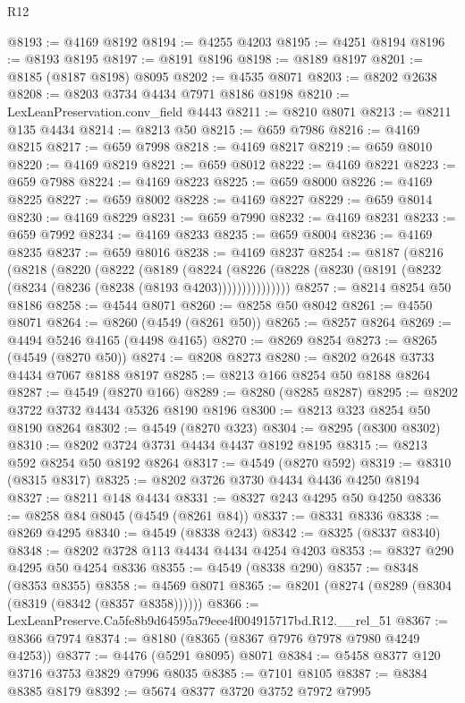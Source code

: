 \begin{lexlean}{R12}
\begin{coremodule}
@8193 := @4169 @8192
@8194 := @4255 @4203
@8195 := @4251 @8194
@8196 := @8193 @8195
@8197 := @8191 @8196
@8198 := @8189 @8197
@8201 := @8185 (@8187 @8198) @8095
@8202 := @4535 @8071
@8203 := @8202 @2638
@8208 := @8203 @3734 @4434 @7971 @8186 @8198
@8210 := LexLeanPreservation.conv_field @4443
@8211 := @8210 @8071
@8213 := @8211 @135 @4434
@8214 := @8213 @50
@8215 := @659 @7986
@8216 := @4169 @8215
@8217 := @659 @7998
@8218 := @4169 @8217
@8219 := @659 @8010
@8220 := @4169 @8219
@8221 := @659 @8012
@8222 := @4169 @8221
@8223 := @659 @7988
@8224 := @4169 @8223
@8225 := @659 @8000
@8226 := @4169 @8225
@8227 := @659 @8002
@8228 := @4169 @8227
@8229 := @659 @8014
@8230 := @4169 @8229
@8231 := @659 @7990
@8232 := @4169 @8231
@8233 := @659 @7992
@8234 := @4169 @8233
@8235 := @659 @8004
@8236 := @4169 @8235
@8237 := @659 @8016
@8238 := @4169 @8237
@8254 := @8187
    (@8216
      (@8218
        (@8220
          (@8222
            (@8189
              (@8224
                (@8226 (@8228 (@8230 (@8191 (@8232 (@8234 (@8236 (@8238 (@8193 @4203)))))))))))))))
@8257 := @8214 @8254 @50 @8186
@8258 := @4544 @8071
@8260 := @8258 @50 @8042
@8261 := @4550 @8071
@8264 := @8260 (@4549 (@8261 @50))
@8265 := @8257 @8264
@8269 := @4494 @5246 @4165 (@4498 @4165)
@8270 := @8269 @8254
@8273 := @8265 (@4549 (@8270 @50))
@8274 := @8208 @8273
@8280 := @8202 @2648 @3733 @4434 @7067 @8188 @8197
@8285 := @8213 @166 @8254 @50 @8188 @8264
@8287 := @4549 (@8270 @166)
@8289 := @8280 (@8285 @8287)
@8295 := @8202 @3722 @3732 @4434 @5326 @8190 @8196
@8300 := @8213 @323 @8254 @50 @8190 @8264
@8302 := @4549 (@8270 @323)
@8304 := @8295 (@8300 @8302)
@8310 := @8202 @3724 @3731 @4434 @4437 @8192 @8195
@8315 := @8213 @592 @8254 @50 @8192 @8264
@8317 := @4549 (@8270 @592)
@8319 := @8310 (@8315 @8317)
@8325 := @8202 @3726 @3730 @4434 @4436 @4250 @8194
@8327 := @8211 @148 @4434
@8331 := @8327 @243 @4295 @50 @4250
@8336 := @8258 @84 @8045 (@4549 (@8261 @84))
@8337 := @8331 @8336
@8338 := @8269 @4295
@8340 := @4549 (@8338 @243)
@8342 := @8325 (@8337 @8340)
@8348 := @8202 @3728 @113 @4434 @4434 @4254 @4203
@8353 := @8327 @290 @4295 @50 @4254 @8336
@8355 := @4549 (@8338 @290)
@8357 := @8348 (@8353 @8355)
@8358 := @4569 @8071
@8365 := @8201 (@8274 (@8289 (@8304 (@8319 (@8342 (@8357 @8358))))))
@8366 := LexLeanPreserve.Ca5fe8b9d64595a79eee4f004915717bd.R12.__rel_51
@8367 := @8366 @7974
@8374 := @8180 (@8365 (@8367 @7976 @7978 @7980 @4249 @4253))
@8377 := @4476 (@5291 @8095) @8071
@8384 := @5458 @8377 @120 @3716 @3753 @3829 @7996 @8035
@8385 := @7101 @8105
@8387 := @8384 @8385 @8179
@8392 := @5674 @8377 @3720 @3752 @7972 @7995

\end{coremodule}
\end{lexlean}
